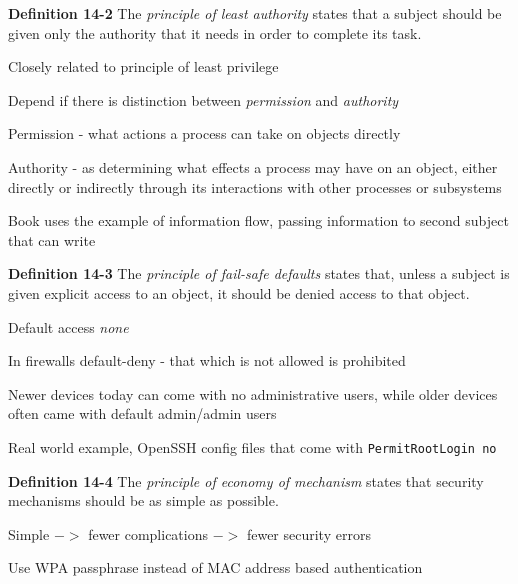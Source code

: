 \documentclass[Screen16to9,17pt]{foils}
\begin{document}
\begin{list1}
\item
\item {\bf Definition 14-2} The \emph{principle of least authority} states that a subject should be given only the authority that it needs in order to complete its task.
\item Closely related to principle of least privilege
\item Depend if there is distinction between \emph{permission} and \emph{authority}
\item Permission - what actions a process can take on objects directly
\item Authority - as determining what effects a process may have on an object, either directly or indirectly through its interactions with other processes or subsystems
\item Book uses the example of information flow, passing information to second subject that can write
\end{list1}



\begin{list1}
\item {\bf Definition 14-3} The \emph{principle of fail-safe defaults} states that, unless a subject is given explicit access to an object, it should be denied access to that object.
\item Default access \emph{none}
\item In firewalls default-deny - that which is not allowed is prohibited
\item Newer devices today can come with no administrative users, while older devices often came with default admin/admin users
\item Real world example, OpenSSH config files that come with \verb+PermitRootLogin no+
\end{list1}



\begin{list1}
\item {\bf Definition 14-4} The \emph{principle of economy of mechanism} states that security mechanisms should be as simple as possible.
\item Simple $->$ fewer complications $->$ fewer security errors
\item Use WPA passphrase instead of MAC address based authentication
\item
\end{list1}
\end{document}
